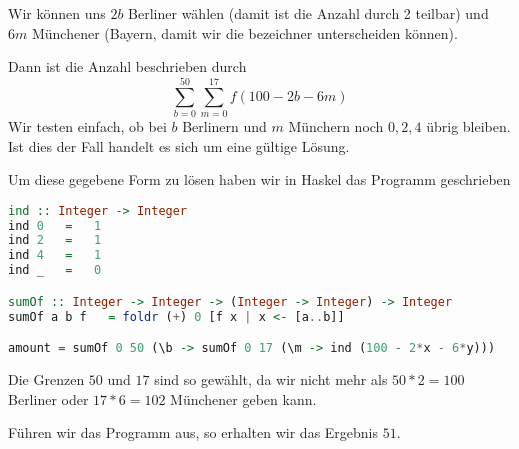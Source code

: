 \documentclass[11pt,a4paper,ngerman]{article}
\begin{document}
Wir können uns $2b$ Berliner wählen (damit ist die Anzahl durch 2 teilbar)
und $6m$ Münchener (Bayern, damit wir die bezeichner unterscheiden können).

Dann ist die Anzahl beschrieben durch
$$
    \overset{50}{\underset{b=0}{\sum}} \overset{17}{\underset{m=0}{\sum}} f(100 - 2b - 6m)
$$
Wir testen einfach, ob bei $b$ Berlinern und $m$ Münchern noch $0,2,4$ übrig bleiben. Ist dies
der Fall handelt es sich um eine gültige Lösung.

Um diese gegebene Form zu lösen haben wir in Haskel das Programm geschrieben

\begin{lstlisting}[language=Haskell]
ind :: Integer -> Integer
ind 0   =   1
ind 2   =   1
ind 4   =   1
ind _   =   0

sumOf :: Integer -> Integer -> (Integer -> Integer) -> Integer
sumOf a b f   = foldr (+) 0 [f x | x <- [a..b]]

amount = sumOf 0 50 (\b -> sumOf 0 17 (\m -> ind (100 - 2*x - 6*y)))
\end{lstlisting}

Die Grenzen $50$ und $17$ sind so gewählt, da wir nicht mehr als $50*2 = 100$ Berliner oder
$17*6 = 102$ Münchener geben kann.

Führen wir das Programm aus, so erhalten wir das Ergebnis $51$.

\label{LastPage}
\end{document}
